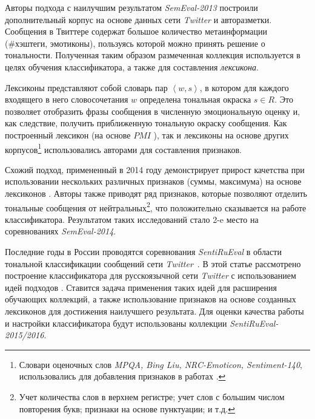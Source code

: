     Авторы подхода с наилучшим результатом {\it SemEval-2013} \cite{tonalityAnalysis}
    построили дополнительный корпус на основе данных сети {\it Twitter} и
    авторазметки.
    Сообщения в Твиттере содержат большое количество метаинформации (\#хэштеги,
    эмотиконы), пользуясь которой можно принять решение о тональности.
    Полученная таким образом размеченная коллекция используется в целях
    обучения классификатора, а также для составления {\it лексикона}.

    Лексиконы представляют собой словарь пар $\left<w, s\right>$, в котором для каждого
    входящего в него словосочетания $w$ определена тональная окраска $s \in R$.
    Это позволяет отобразить фразы сообщения в численную эмоциональную оценку и,
    как следствие, получить приближенную тональную окраску сообщения.
    Как построенный лексикон (на основе $PMI$ \cite{lexiconSO}), так и лексиконы
    на основе других корпусов\footnote{
        Словари оценочных слов {\it MPQA, Bing Liu, NRC-Emoticon, Sentiment-140},
        использовались для добавления признаков в работах
        \cite{tonalityAnalysis,modernApproach}.
    }
    использовались авторами \cite{tonalityAnalysis} для составления признаков.

    Схожий подход, примененный в 2014 году демонстрирует прирост качетства при
    использовании нескольких различных признаков (суммы, максимума) на основе
    лексиконов \cite{modernApproach}.
    Авторы также приводят ряд признаков, которые позволяют отделить тональные
    сообщения от нейтральных\footnote{
        Учет количества слов в верхнем регистре;
        учет слов с большим числом повторения букв;
        признаки на основе пунктуации;
        и т.д.
    }, что положительно сказывается на работе классификатора.
    Результатом таких исследований стало 2-e место на соревнованиях {\it SemEval-2014}.

    Последние годы в России проводятся соревнования {\it SentiRuEval} в области
    тональной классификации сообщений сети {\it Twitter}~\cite{dialog2015,dialog2016}.
    В этой статье рассмотрено построение классификатора для русскоязычной сети
    {\it Twitter} с использованием идей подходов \cite{tonalityAnalysis, modernApproach}.
    Ставится задача применения таких идей для расширения обучающих коллекций,
    а также использование признаков на основе созданных лексиконов для
    достижения наилучшего результата.
    Для оценки качества работы и настройки классификатора будут использованы
    коллекции {\it SentiRuEval-2015/2016}.
